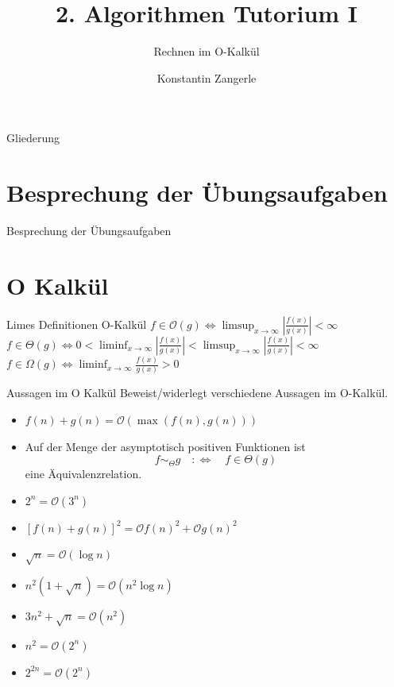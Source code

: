 \documentclass[18pt]{beamer}
\title[Algo I Tut]{2. Algorithmen Tutorium I}
\subtitle{Rechnen im O-Kalkül}
\author[Zangerle]{Konstantin Zangerle}
\institute{Institut für Theoretische Informatik}
\newcommand{\Oh}{\mathcal{O}}
\begin{document}

\begin{frame}
\titlepage
\end{frame}

\begin{frame}{Gliederung}
 \tableofcontents
\end{frame}

\section{Besprechung der Übungsaufgaben}
\begin{frame}{Besprechung der Übungsaufgaben}
\end{frame}

\section{O Kalkül}
\begin{frame}{Limes Definitionen O-Kalkül}
 $f \in \Oh(g) \iff \limsup_{x \to \infty}| \frac{f(x)}{g(x)}| < \infty$ \\
 $f \in \Theta(g) \iff 0 < \liminf_{x \to \infty} | \frac{f(x)}{g(x)} |< \limsup_{x \to \infty} |\frac{f(x)}{g(x)} |< \infty$ \\
 $f \in \Omega(g) \iff \liminf_{x \to \infty} \frac{f(x)}{g(x)} > 0$ \\
\end{frame}

\begin{frame}{Aussagen im O Kalkül}
Beweist/widerlegt verschiedene Aussagen im O-Kalkül.
  \begin{itemize}
    \item $f(n) + g(n) = \Oh({\max(f(n),g(n))})$
    \item Auf der Menge der asymptotisch positiven Funktionen ist 
      $$f \sim_{\Theta} g \quad:\Longleftrightarrow\quad f \in \Theta(g)$$
      eine Äquivalenzrelation.
    \item $2^{n} = \Oh({3^n})$
    \item $[ f(n) + g(n) ]^2 = \Oh{f(n)^2} + \Oh{g(n)^2}$
    \item $\sqrt{n} = \Oh({{\log n}})$
    \item $n^2(1+\sqrt{n}) = \Oh({n^2 \log n})$
    \item $3n^2 + \sqrt{n} = \Oh({n^2})$
    \item $n^2 = \Oh({2^n})$
    \item $2^{2n} = \Oh({2^n})$
  \end{itemize}
\end{frame}
\end{document}
